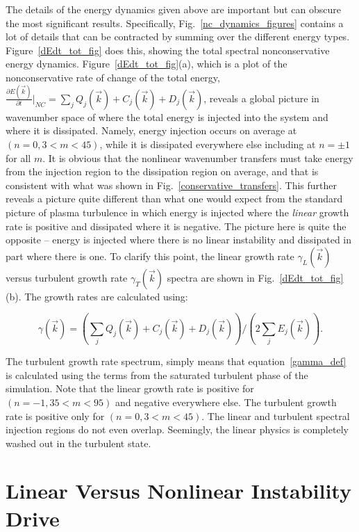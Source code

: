 \documentclass[showpacs,preprintnumbers,amsmath,amssymb,superscriptaddress]{revtex4}
\def\beq{\begin{equation}}
\def\eeq{\end{equation}}
\newcommand{\pdiff}[2]{\frac{\partial#1}{\partial#2}}
\begin{document}
The details of the energy dynamics given above are important but can obscure the most significant results. Specifically, Fig.~\ref{nc_dynamics_figures} contains a lot of details
that can be contracted by summing over the different energy types.
Figure~\ref{dEdt_tot_fig} does this, showing the total spectral nonconservative energy dynamics.
Figure~\ref{dEdt_tot_fig}(a), which is a plot of the nonconservative rate of change of the total energy, $ \pdiff{E(\vec{k})}{t} \big|_{NC} = \sum_j Q_j(\vec{k}) + C_j(\vec{k}) + D_j(\vec{k})$, 
reveals a global picture in wavenumber space of
where the total energy is injected into the system and where it is dissipated. Namely, energy injection occurs on average at $(n=0, 3<m<45)$, 
while it is dissipated everywhere else including at $n=\pm 1$ for all $m$. It is obvious that the nonlinear wavenumber transfers must take energy from the injection region to the dissipation
region on average, and that is consistent with what was shown in Fig.~\ref{conservative_transfers}.
This further reveals a picture quite different than what one would expect from the standard picture of plasma turbulence in which energy is 
injected where the \emph{linear} growth rate is positive and dissipated
where it is negative. The picture here is quite the opposite -- energy is injected where there is no linear instability and dissipated in part where there is one.
To clarify this point, the linear growth rate $\gamma_L(\vec{k})$ versus turbulent growth rate $\gamma_{T}(\vec{k})$ spectra are shown in Fig.~\ref{dEdt_tot_fig}(b). 
The growth rates are calculated using:

\beq
\label{gamma_def}
\gamma(\vec{k}) = \left( \sum_j Q_j(\vec{k}) + C_j(\vec{k}) + D_j(\vec{k}) \right)/\left( 2 \sum_j E_j(\vec{k}) \right).
\eeq

The turbulent growth rate spectrum, simply means that equation~\ref{gamma_def} is calculated using the terms from the saturated turbulent phase of the simulation.
Note that the linear growth rate is positive for $(n=-1, 35<m<95)$ and negative everywhere else. The turbulent growth rate is positive only
for $(n=0, 3<m<45)$. The linear and turbulent spectral injection regions do not even overlap. Seemingly, the linear physics is completely washed out in the turbulent state. 


\section{Linear Versus Nonlinear Instability Drive}
\end{document}
